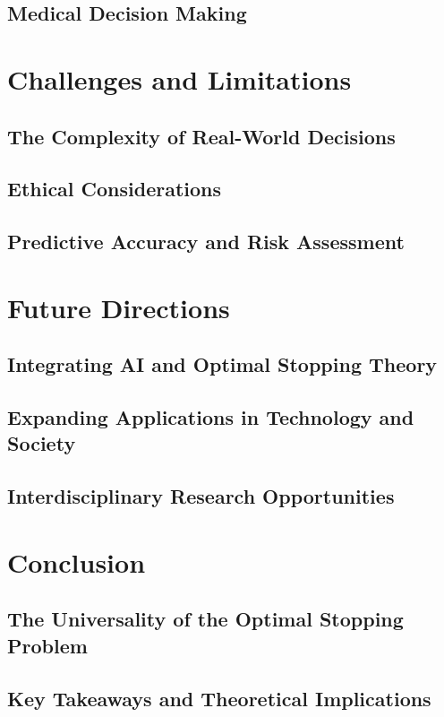 \documentclass[12pt]{book} %
\begin{document}
\subsection{Medical Decision Making}

\section{Challenges and Limitations}
\subsection{The Complexity of Real-World Decisions}
\subsection{Ethical Considerations}
\subsection{Predictive Accuracy and Risk Assessment}

\section{Future Directions}
\subsection{Integrating AI and Optimal Stopping Theory}
\subsection{Expanding Applications in Technology and Society}
\subsection{Interdisciplinary Research Opportunities}

\section{Conclusion}
\subsection{The Universality of the Optimal Stopping Problem}
\subsection{Key Takeaways and Theoretical Implications}
\end{document}
